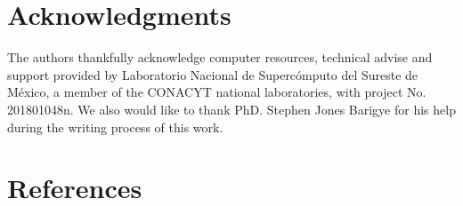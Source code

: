 \documentclass[review]{elsarticle}
\begin{document}
\section*{Acknowledgments}
The authors thankfully acknowledge computer resources, technical advise and support provided by Laboratorio Nacional de Superc\'omputo del Sureste de M\'exico, a member of the CONACYT national laboratories, with project No. 201801048n. We also would like to thank PhD. Stephen Jones Barigye for his help during the writing process of this work.


\section*{References}


\end{document}

